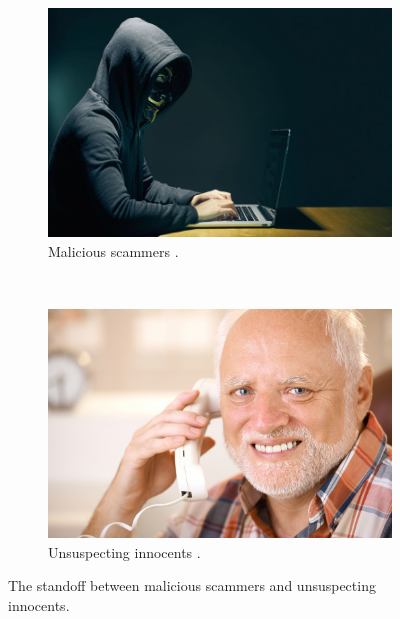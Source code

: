 \documentclass[main.tex]{subfiles}
\begin{document}
\begin{figure}[htb]
	\captionsetup[subfigure]{position=b}
        \centering
        \begin{subfigure}{0.4\textwidth}
                \includegraphics[width=\textwidth]{pics/hacker}
                \caption{Malicious scammers \cite{hacker}.}
                \label{fig:hacker}
        \end{subfigure}
        ~
		\begin{subfigure}{0.4\textwidth}
                \includegraphics[width=\textwidth]{pics/harold}
                \caption{Unsuspecting innocents \cite{harold}.}
                \label{fig:harold}
        \end{subfigure}
	\caption{The standoff between malicious scammers and unsuspecting innocents.}
	\label{fig:memes}
\end{figure}
\vspace{-0.75cm}
\end{document}
